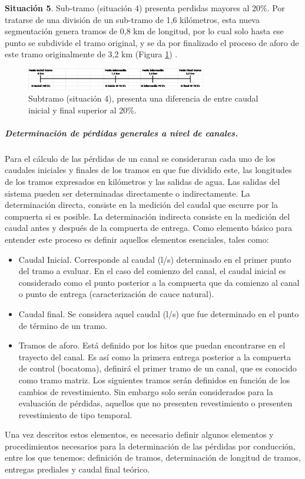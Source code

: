 \documentclass[]{article}
\begin{document}
\textbf{Situación 5}. Sub-tramo (situación 4) presenta perdidas mayores al 20\%. Por tratarse de una división de un sub-tramo de 1,6 kilómetros, esta nueva segmentación genera tramos de 0,8 km de longitud, por lo cual solo hasta ese punto se subdivide el tramo original, y se da por finalizado el proceso de aforo de este tramo originalmente de 3,2 km (Figura \ref{sit_5}) .\\

\begin{figure}[h]
\centering
\includegraphics[width=0.7\textwidth]{images/sit_5.eps}
\caption{Subtramo (situación 4), presenta una diferencia de entre caudal inicial y final superior al 20\%.}
\label{sit_5}
\end{figure}

\subparagraph{Determinación de pérdidas generales a nivel de canales.}
Para el cálculo de las pérdidas de un canal se consideraran cada uno de los caudales iniciales y finales de los tramos en que fue dividido este, las longitudes de los tramos expresados en kilómetros y las salidas de agua. Las salidas del sistema pueden ser determinadas directamente o indirectamente. La determinación directa, consiste en la medición del caudal que escurre por la compuerta si es posible. La determinación indirecta consiste en la medición del caudal antes y después de la compuerta de entrega. Como elemento básico para entender este proceso es definir aquellos elementos esenciales, tales como:
\begin{itemize}
\item Caudal Inicial. Corresponde al caudal (l/s) determinado en el primer punto del tramo a evaluar. En el caso del comienzo del canal, el caudal inicial es considerado como el punto posterior a la compuerta que da comienzo al canal o punto de entrega (caracterización de cauce natural).
\item Caudal final. Se considera aquel caudal (l/s) que fue determinado en el punto de término de un tramo.
\item Tramos de aforo. Está definido por los hitos que puedan encontrarse en el trayecto del canal. Es así como la primera entrega posterior a la compuerta de control (bocatoma), definirá el primer tramo de un canal, que es conocido como tramo matriz. Los siguientes tramos serán definidos en función de los cambios de revestimiento. Sin embargo solo serán considerados para la evaluación de pérdidas, aquellos que no presenten revestimiento o presenten revestimiento de tipo temporal.
\end{itemize}
Una vez descritos estos elementos, es necesario definir algunos elementos y procedimientos necesarios para la determinación de las pérdidas por conducción, entre los que tenemos: definición de tramos, determinación de longitud de tramos, entregas prediales y caudal final teórico.\\
\end{document}
